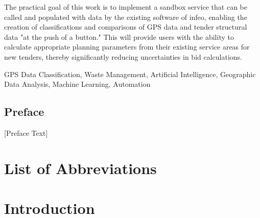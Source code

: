 \documentclass[a4paper,12pt,twoside]{scrreprt}
\begin{document}
The practical goal of this work is to implement a sandbox service that can be
called and populated with data by the existing software of infeo, enabling the
creation of classifications and comparisons of GPS data and tender structural
data "at the push of a button." This will provide users with the ability to
calculate appropriate planning parameters from their existing service areas for
new tenders, thereby significantly reducing uncertainties in bid calculations.
\vspace{0.5cm}

\noindent
GPS Data Classification, Waste Management, Artificial Intelligence, Geographic
Data Analysis, Machine Learning, Automation

\newpage
\section*{Preface}   %

 [Preface Text]

\cleardoublepage   %
\tableofcontents

\clearpage
{}
{}
\listoffigures

\clearpage
{}
{}
\listoftables

\clearpage
{}
{}
\chapter*{List of Abbreviations} %
\begin{acronym}[GPS]
\end{acronym}

\chapter{Introduction}
\end{document}
